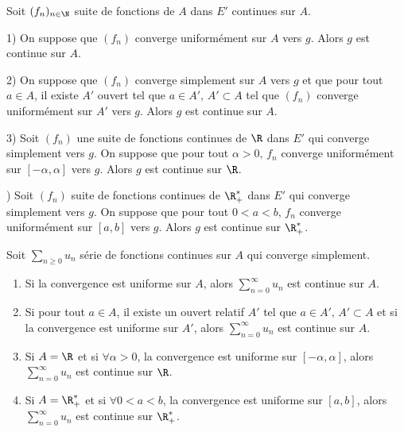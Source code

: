 \begin{theoreme}{}{}
    Soit $(f_n)_{n \in \N}$ suite de fonctions de $A$ dans $E'$ continues sur $A$. 
    
    1) On suppose que $(f_n)$ converge uniformément sur $A$ vers $g$. Alors $g$ est continue sur $A$.


    2) On suppose que $(f_n)$ converge simplement sur $A$ vers $g$ et que pour tout $a \in A$,
    il existe $A'$ ouvert tel que $a \in A', \, A' \subset A$ tel que $(f_n)$ converge uniformément sur $A'$ vers $g$.
    Alors $g$ est continue sur $A$.


    3) Soit $(f_n)$ une suite de fonctions continues de $\R$ dans $E'$ qui converge simplement vers $g$. 
    On suppose que pour tout $\alpha > 0, \, f_n$ converge uniformément sur $[-\alpha, \alpha]$ vers $g$.
    Alors $g$ est continue sur $\R$.

    ) Soit $(f_n)$ suite de fonctions continues de $\R_+^*$ dans $E'$ qui converge simplement vers $g$. 
    On suppose que pour tout $0<a<b, \, f_n$ converge uniformément sur $[a, b]$ vers $g$.
    Alors $g$ est continue sur $\R_+^*$.
\end{theoreme}

\begin{theoreme}{}{}
    Soit $\sum_{n \geqslant 0 } u_n$ série de fonctions continues sur $A$ qui converge 
    simplement. 

    \begin{enumerate}
        \item Si la convergence est uniforme sur $A$, alors $\displaystyle \sum_{n = 0}^{\infty} u_n$ est continue sur $A$.
        \item Si pour tout $a \in A$, il existe un ouvert relatif $A'$ tel que $a \in A', \, A' \subset A$ et
        si la convergence est uniforme sur $A'$, alors $\displaystyle \sum_{n = 0}^{\infty} u_n$ est continue sur $A$.
        \item Si $A = \R$ et si $\forall \alpha > 0$, la convergence est uniforme sur $[-\alpha, \alpha]$, 
        alors $\displaystyle \sum_{n = 0}^{\infty} u_n$ est continue sur $\R$.
        \item Si $A = \R_+^*$ et si $\forall 0 < a < b$, la convergence est uniforme sur $[a, b]$,
        alors $\displaystyle \sum_{n = 0}^{\infty} u_n$ est continue sur $\R_+^*$.
    \end{enumerate}
\end{theoreme}


